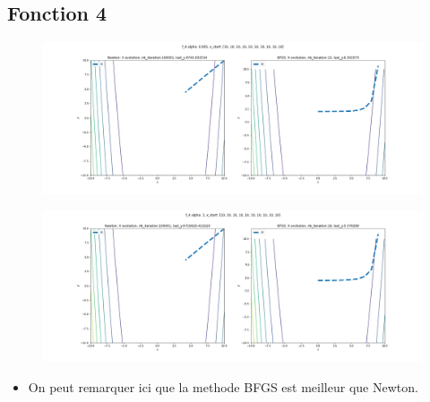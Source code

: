 \documentclass[twoside,10pt,a4paper]{article}
\numberwithin{equation}{section}					%
\numberwithin{figure}{section}						%
\begin{document}
\subsection{Fonction 4 }\label{sec:subsection2}
\begin{figure}[H]
    \centering
    \includegraphics[width=\textwidth]{imgs/comparaison/f_4_a-0.005.png}
    \caption{}
\end{figure}
\begin{figure}[H]
    \centering
    \includegraphics[width=\textwidth]{imgs/comparaison/f_4_a-3.png}
    \caption{}
\end{figure}
\begin{itemize}
	\item On peut remarquer ici que la methode BFGS est meilleur que Newton.
\end{itemize}
\end{document}
